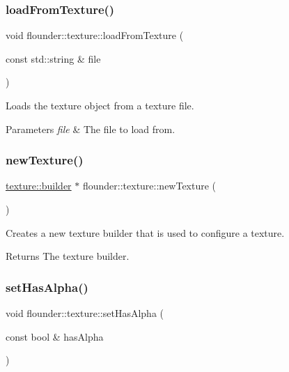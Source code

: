 \subsubsection{\texorpdfstring{load\+From\+Texture()}{loadFromTexture()}}
{\footnotesize\ttfamily void flounder\+::texture\+::load\+From\+Texture (\begin{DoxyParamCaption}\item[{const std\+::string \&}]{file }\end{DoxyParamCaption})\hspace{0.3cm}{\ttfamily [private]}}



Loads the texture object from a texture file. 


\begin{DoxyParams}{Parameters}
{\em file} & The file to load from. \\
\hline
\end{DoxyParams}
\mbox{\label{classflounder_1_1texture_af6311afbba328755cd0ff6a7839e9172}} 
\subsubsection{\texorpdfstring{new\+Texture()}{newTexture()}}
{\footnotesize\ttfamily \hyperlink{classflounder_1_1texture_1_1builder}{texture\+::builder} $\ast$ flounder\+::texture\+::new\+Texture (\begin{DoxyParamCaption}{ }\end{DoxyParamCaption})\hspace{0.3cm}{\ttfamily [static]}}



Creates a new texture builder that is used to configure a texture. 

\begin{DoxyReturn}{Returns}
The texture builder. 
\end{DoxyReturn}
\mbox{\label{classflounder_1_1texture_ac05209e3a9686903a336575ac71b8f0e}} 
\subsubsection{\texorpdfstring{set\+Has\+Alpha()}{setHasAlpha()}}
{\footnotesize\ttfamily void flounder\+::texture\+::set\+Has\+Alpha (\begin{DoxyParamCaption}\item[{const bool \&}]{has\+Alpha }\end{DoxyParamCaption})\hspace{0.3cm}{\ttfamily [inline]}}



